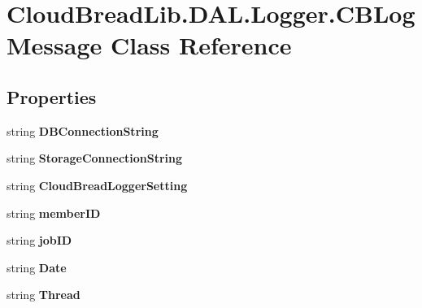\hypertarget{a00044}{}\section{Cloud\+Bread\+Lib.\+D\+A\+L.\+Logger.\+C\+B\+Log\+Message Class Reference}
\label{a00044}
\subsection*{Properties}
\begin{DoxyCompactItemize}
\item 
string {\bfseries D\+B\+Connection\+String}\hypertarget{a00044_ae2a4b77a45768901d3b3fb1d9ad56999}{}\label{a00044_ae2a4b77a45768901d3b3fb1d9ad56999}

\item 
string {\bfseries Storage\+Connection\+String}\hypertarget{a00044_aecdb4b5d752435d17102110ef8d68d60}{}\label{a00044_aecdb4b5d752435d17102110ef8d68d60}

\item 
string {\bfseries Cloud\+Bread\+Logger\+Setting}\hypertarget{a00044_a27b68a579fcdc11169ba6f051305cc4e}{}\label{a00044_a27b68a579fcdc11169ba6f051305cc4e}

\item 
string {\bfseries member\+ID}\hypertarget{a00044_ae5b221a36696db8245a90a1d741f2e93}{}\label{a00044_ae5b221a36696db8245a90a1d741f2e93}

\item 
string {\bfseries job\+ID}\hypertarget{a00044_a06a5091b929c6272fd58ff41c11dc837}{}\label{a00044_a06a5091b929c6272fd58ff41c11dc837}

\item 
string {\bfseries Date}\hypertarget{a00044_a3e54d4484987301a22735526ef9c5976}{}\label{a00044_a3e54d4484987301a22735526ef9c5976}

\item 
string {\bfseries Thread}\hypertarget{a00044_aa9adee6a804c6d34a37c6ef47fbfc85e}{}\label{a00044_aa9adee6a804c6d34a37c6ef47fbfc85e}


\end{DoxyCompactItemize}
